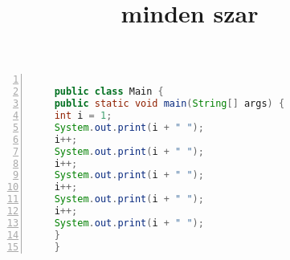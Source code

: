 \documentclass{article}
\title{minden szar}
\begin{document}
\maketitle
{}
\begin{code}
\begin{lstlisting}[language=java, numbers=left, frame=shadowbox, caption= NEIN]

    public class Main {
    public static void main(String[] args) {
    int i = 1;
    System.out.print(i + " ");
    i++;
    System.out.print(i + " ");
    i++;
    System.out.print(i + " ");
    i++;
    System.out.print(i + " ");
    i++;
    System.out.print(i + " ");
    }
	}
\end{lstlisting}
\end{code}
\end{document}
